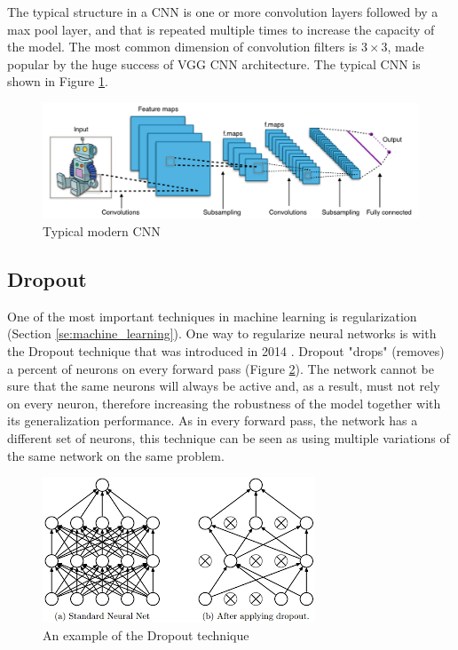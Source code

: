 \documentclass[times, utf8, diplomski]{fer}
\begin{document}
The typical structure in a CNN is one or more convolution layers followed by a max pool layer, and that is repeated multiple times to increase the capacity of the model. The most common dimension of convolution filters is $3\times3$, made popular by the huge success of VGG \citep{simonyan_very_2014} CNN architecture. The typical CNN is shown in Figure \ref{fig:cnn}.

\begin{figure}
  \includegraphics[scale=0.43]{figures/cnn.png}
  \centering
  \caption{Typical modern CNN}
  \label{fig:cnn}
\end{figure}

\subsection{Dropout} \label{se:dropout}

One of the most important techniques in machine learning is regularization (Section \ref{se:machine_learning}). One way to regularize neural networks is with the Dropout technique that was introduced in 2014 \citep{srivastava_dropout:_2014}. Dropout "drops" (removes) a percent of neurons on every forward pass (Figure \ref{fig:dropout}). The network cannot be sure that the same neurons will always be active and, as a result, must not rely on every neuron, therefore increasing the robustness of the model together with its generalization performance. As in every forward pass, the network has a different set of neurons, this technique can be seen as using multiple variations of the same network on the same problem.

\begin{figure}
  \includegraphics[scale=0.91]{figures/dropout.png}
  \centering
  \caption{An example of the Dropout technique}
  \label{fig:dropout}
\end{figure}
\end{document}
